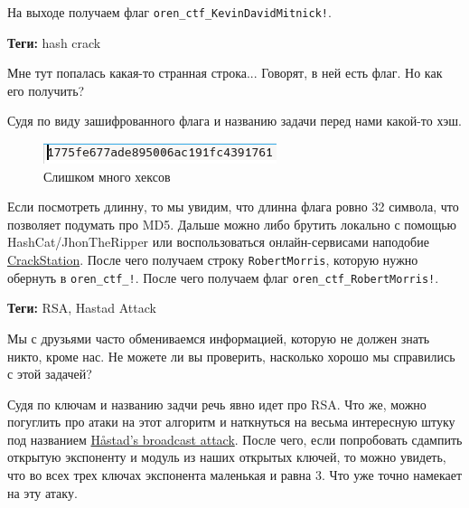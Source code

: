 \documentclass[idxtotoc,hyperref,openany,oneside]{files/crypto} %
\begin{document}
На выходе получаем флаг \verb|oren_ctf_KevinDavidMitnick!|.



\textbf{Теги:} hash crack\vspace{\baselineskip}

\begin{tcolorbox}
Мне тут попалась какая-то странная строка... Говорят, в ней есть флаг. Но как его получить?
\end{tcolorbox}

Судя по виду зашифрованного флага и названию задачи перед нами какой-то хэш.
\begin{figure}[H]
\begin{center}
\includegraphics[width=1.0\linewidth]{files/md5flag}
\end{center}
\caption{Слишком много хексов}
\label{fig:chinese}
\end{figure}
Если посмотреть длинну, то мы увидим, что длинна флага ровно 32 символа, что позволяет подумать про MD5. Дальше можно либо брутить локально с помощью HashCat/JhonTheRipper или воспользоваться онлайн-сервисами наподобие \href{https://crackstation.net/}{CrackStation}. После чего получаем строку \verb|RobertMorris|, которую нужно обернуть в \verb|oren_ctf_!|. После чего получаем флаг \verb|oren_ctf_RobertMorris!|.




\textbf{Теги:} RSA, Hastad Attack\vspace{\baselineskip}

\begin{tcolorbox}
Мы с друзьями часто обмениваемся информацией, которую не должен знать никто, кроме нас. Не можете ли вы проверить, насколько хорошо мы справились с этой задачей?
\end{tcolorbox}

Судя по ключам и названию задчи речь явно идет про RSA. Что же, можно погуглить про атаки на этот алгоритм и наткнуться на весьма интересную штуку под названием \href{https://en.wikipedia.org/wiki/Coppersmith\%27s_attack#H\%C3\%A5stad's_broadcast_attack}{Håstad's broadcast attack}. После чего, если попробовать сдампить открытую экспоненту и модуль из наших открытых ключей, то можно увидеть, что во всех трех ключах экспонента маленькая и равна 3. Что уже точно намекает на эту атаку. 
\end{document}
